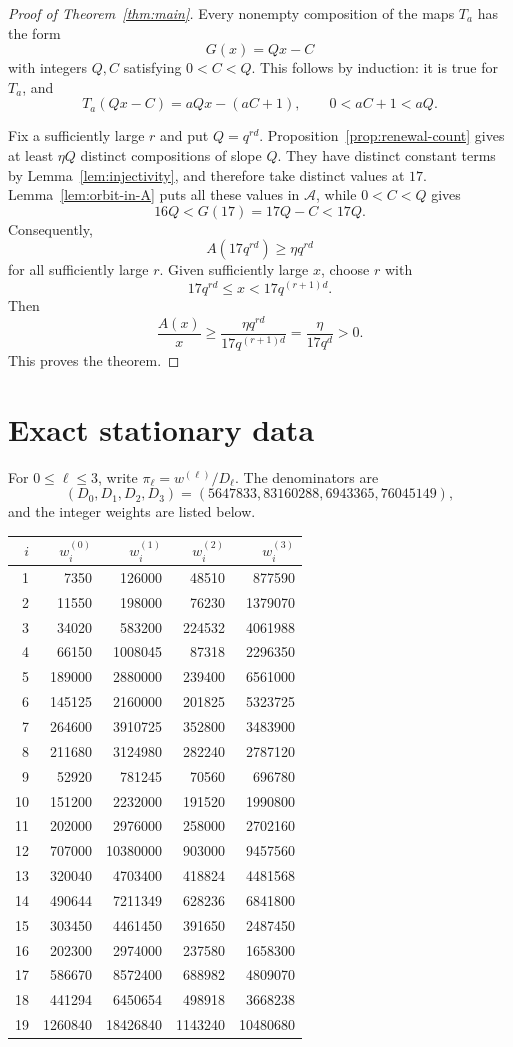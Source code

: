 \documentclass[11pt,a4paper]{amsart}
\newcommand{\A}{\mathcal A}
\begin{document}
\begin{proof}[Proof of Theorem~\ref{thm:main}]
Every nonempty composition of the maps $T_a$ has the form
\[
 G(x)=Qx-C
\]
with integers $Q,C$ satisfying $0<C<Q$. This follows by induction: it is true for $T_a$, and
\[
 T_a(Qx-C)=aQx-(aC+1),
 \qquad 0<aC+1<aQ.
\]

Fix a sufficiently large $r$ and put $Q=q^{rd}$. Proposition~\ref{prop:renewal-count} gives at least $\eta Q$ distinct compositions of slope $Q$. They have distinct constant terms by Lemma~\ref{lem:injectivity}, and therefore take distinct values at $17$. Lemma~\ref{lem:orbit-in-A} puts all these values in $\A$, while $0<C<Q$ gives
\[
 16Q<G(17)=17Q-C<17Q.
\]
Consequently,
\[
 A(17q^{rd})\ge\eta q^{rd}
\]
for all sufficiently large $r$. Given sufficiently large $x$, choose $r$ with
\[
 17q^{rd}\le x<17q^{(r+1)d}.
\]
Then
\[
 \frac{A(x)}x\ge
 \frac{\eta q^{rd}}{17q^{(r+1)d}}
 =\frac{\eta}{17q^d}>0.
\]
This proves the theorem.
\end{proof}

\appendix
\section{Exact stationary data}\label{app:data}

For $0\le\ell\le3$, write $\pi_\ell=w^{(\ell)}/D_\ell$. The denominators are
\[
 (D_0,D_1,D_2,D_3)=(5647833,83160288,6943365,76045149),
\]
and the integer weights are listed below.

\begin{center}
\scriptsize
\renewcommand{\arraystretch}{0.93}
\begin{tabular}{r|rrrr}
\toprule
$i$&$w_i^{(0)}$&$w_i^{(1)}$&$w_i^{(2)}$&$w_i^{(3)}$\\
\midrule
1&7350&126000&48510&877590\\
2&11550&198000&76230&1379070\\
3&34020&583200&224532&4061988\\
4&66150&1008045&87318&2296350\\
5&189000&2880000&239400&6561000\\
6&145125&2160000&201825&5323725\\
7&264600&3910725&352800&3483900\\
8&211680&3124980&282240&2787120\\
9&52920&781245&70560&696780\\
10&151200&2232000&191520&1990800\\
11&202000&2976000&258000&2702160\\
12&707000&10380000&903000&9457560\\
13&320040&4703400&418824&4481568\\
14&490644&7211349&628236&6841800\\
15&303450&4461450&391650&2487450\\
16&202300&2974000&237580&1658300\\
17&586670&8572400&688982&4809070\\
18&441294&6450654&498918&3668238\\
19&1260840&18426840&1143240&10480680\\
\bottomrule
\end{tabular}
\end{center}
\end{document}
